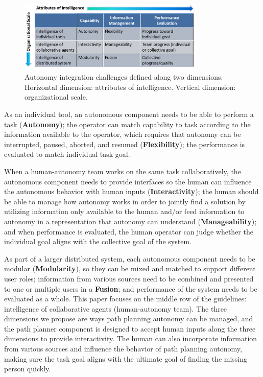 \documentclass[lettersize, apacite, twoside, HRI]{apa_HRI}
\begin{document}
\begin{figure}
\centering
\includegraphics[width=3.5in]{IntegrationChallenges.JPG}
\caption{Autonomy integration challenges defined along two dimensions. Horizontal dimension: attributes of intelligence. Vertical dimension: organizational scale.}
\label{IChallenges}
\end{figure}

As an individual tool, an autonomous component needs to be able to perform a task (\textbf{Autonomy}); the operator can match capability to task according to the information available to the operator, which requires that autonomy can be interrupted, paused, aborted, and resumed (\textbf{Flexibility}); the performance is evaluated to match individual task goal. 

When a human-autonomy team works on the same task collaboratively, the autonomous component needs to provide interfaces so the human can influence the autonomous behavior with human inputs (\textbf{Interactivity}); the human should be able to manage how autonomy works in order to jointly find a solution by utilizing information only available to the human and/or feed information to autonomy in a representation that autonomy can understand (\textbf{Manageability}); and when performance is evaluated, the human operator can judge whether the individual goal aligns with the collective goal of the system. 

As part of a larger distributed system, each autonomous component needs to be modular (\textbf{Modularity}), so they can be mixed and matched to support different user roles; information from various sources need to be combined and presented to one or multiple users in a \textbf{Fusion}; and performance of the system needs to be evaluated as a whole. This paper focuses on the middle row of the guidelines: intelligence of collaborative agents (human-autonomy team). The three dimensions we propose are ways path planning autonomy can be managed, and the path planner component is designed to accept human inputs along the three dimensions to provide interactivity. The human can also incorporate information from various sources and influence the behavior of path planning autonomy, making sure the task goal aligns with the ultimate goal of finding the missing person quickly.
\end{document}
